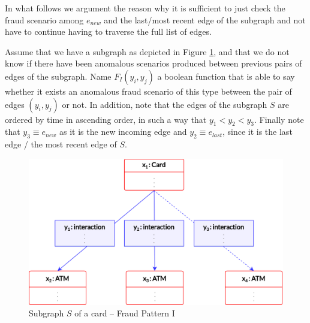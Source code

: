 \documentclass{article}
\begin{document}
In what follows we argument the reason why it is sufficient to just check the fraud scenario among $e_{new}$ and the last/most recent edge of the subgraph and not have to continue having to traverse the full list of edges.

Assume that we have a subgraph as depicted in Figure \ref{img:fp-I-demo}, and that we do not know if there have been anomalous scenarios produced between previous pairs of edges of the subgraph. Name $F_I(y_i,y_j)$ a boolean function that is able to say whether it exists an anomalous fraud scenario of this type between the pair of edges $(y_i,y_j)$ or not. In addition, note that the edges of the subgraph $S$ are ordered by time in ascending order, in such a way that $y_1 < y_2 < y_3$. Finally note that $y_3 \equiv e_{new}$ as it is the new incoming edge and $y_2 \equiv e_{last}$, since it is the last edge / the most recent edge of $S$.

\begin{figure}[H]
  \centering
  \includegraphics[scale = 0.6]{images/fp-I-demo-1.png}
  \caption{Subgraph $S$ of a card -- Fraud Pattern I}
  \label{img:fp-I-demo}
\end{figure}
\end{document}
